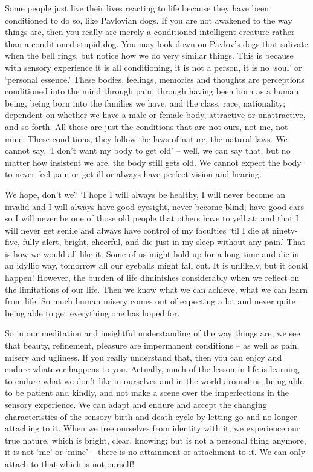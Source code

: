 Some people just live their lives reacting to life because they have been conditioned to do so, like Pavlovian dogs. If you are not awakened to the way things are, then you really are merely a conditioned intelligent creature rather than a conditioned stupid dog. You may look down on Pavlov's dogs that salivate when the bell rings, but notice how we do very similar things. This is because with sensory experience it is all conditioning, it is not a person, it is no `soul' or `personal essence.' These bodies, feelings, memories and thoughts are perceptions conditioned into the mind through pain, through having been born as a human being, being born into the families we have, and the class, race, nationality; dependent on whether we have a male or female body, attractive or unattractive, and so forth. All these are just the conditions that are not ours, not me, not mine. These conditions, they follow the laws of nature, the natural laws. We cannot say, `I don't want my body to get old' -- well, we can say that, but no matter how insistent we are, the body still gets old. We cannot expect the body to never feel pain or get ill or always have perfect vision and hearing.

We hope, don't we? `I hope I will always be healthy, I will never become an invalid and I will always have good eyesight, never become blind; have good ears so I will never be one of those old people that others have to yell at; and that I will never get senile and always have control of my faculties `til I die at ninety-five, fully alert, bright, cheerful, and die just in my sleep without any pain.' That is how we would all like it. Some of us might hold up for a long time and die in an idyllic way, tomorrow all our eyeballs might fall out. It is unlikely, but it could happen! However, the burden of life diminishes considerably when we reflect on the limitations of our life. Then we know what we can achieve, what we can learn from life. So much human misery comes out of expecting a lot and never quite being able to get everything one has hoped for.

So in our meditation and insightful understanding of the way things are, we see that beauty, refinement, pleasure are impermanent conditions -- as well as pain, misery and ugliness. If you really understand that, then you can enjoy and endure whatever happens to you. Actually, much of the lesson in life is learning to endure what we don't like in ourselves and in the world around us; being able to be patient and kindly, and not make a scene over the imperfections in the sensory experience. We can adapt and endure and accept the changing characteristics of the sensory birth and death cycle by letting go and no longer attaching to it. When we free ourselves from identity with it, we experience our true nature, which is bright, clear, knowing; but is not a personal thing anymore, it is not `me' or `mine' -- there is no attainment or attachment to it. We can only attach to that which is not ourself!

